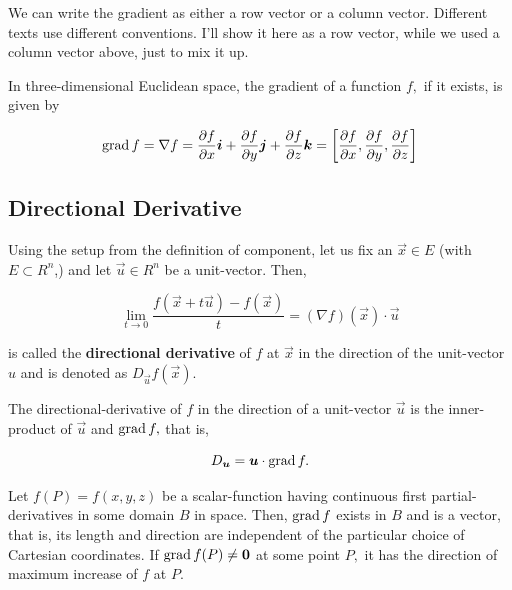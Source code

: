 \documentclass{article}
\begin{document}
\begin{remark}
We can write the \@{gradient} as either a row \@{vector} or a column \@{vector}. Different texts use different conventions. I'll show it here as a row vector, while we used a column vector above, just to mix it up.

In three-dimensional Euclidean space, the \@{gradient} of a function $f,$ if it exists, is given by

\[ \operatorname{grad}{f} = \nabla f = \frac{\partial f}{\partial x} \boldsymbol{i} + \frac{\partial f}{\partial y} \boldsymbol{j} + \frac{\partial f}{\partial z} \boldsymbol{k} = \left[\frac{\partial f}{\partial x}, \frac{\partial f}{\partial y}, \frac{\partial f}{\partial z}\right] \]
\end{remark}

\subsection{Directional Derivative}
\begin{definition}
Using the setup from the definition of \@{component}, let us fix an $\vec{x} \in E$ (with $E \subset R^n$,) and let $\vec{u} \in R^n$ be a \@{unit-vector}. Then,

\[ \lim_{t \to 0} \frac{f(\vec{x} + t \vec{u}) - f(\vec{x})}{t} = (\nabla f)(\vec{x}) \cdot \vec{u} \]

is called the \textbf{directional derivative} of $f$ at $\vec{x}$ in the \@{direction} of the \@{unit-vector} $u$ and is denoted as $D_{\vec{u}}f(\vec{x}).$
\end{definition}

\begin{theorem}\label{directional-derivative-is-inner-product-of-vector-and-grad}
The \@{directional-derivative} of $f$ in the \@{direction} of a \@{unit-vector} $\vec{u}$ is the \@{inner-product} of $\vec{u}$ and $\operatorname{grad}{f},$ that is,

\[ D_{\boldsymbol{u}} = \boldsymbol{u} \cdot \operatorname{grad}{f}. \]
\end{theorem}

\begin{theorem}
Let $f(P) = f(x,y,z)$ be a \@{scalar-function} having \@{continuous} first \@{partial-derivatives} in some \@{domain} $B$ in space. Then, $\operatorname{grad}{f}$ exists in $B$ and is a \@{vector}, that is, its \@{length} and \@{direction} are independent of the particular choice of Cartesian coordinates. If $\operatorname{grad}{f(P)} \neq \boldsymbol{0}$ at some \@{point} $P,$ it has the \@{direction} of maximum increase of $f$ at $P.$
\end{theorem}
\end{document}
